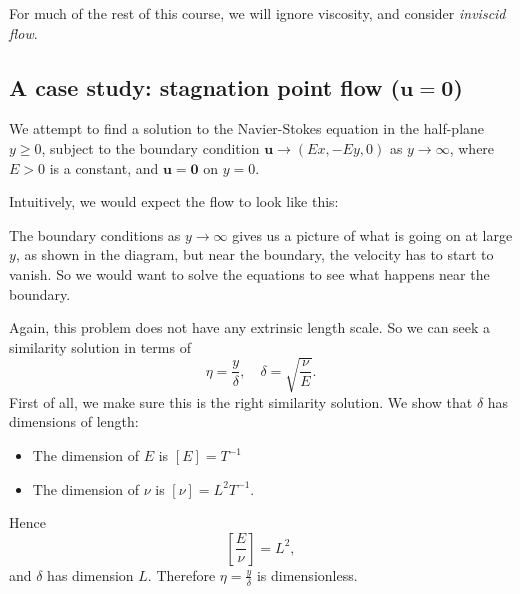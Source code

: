 \documentclass[a4paper]{article}
\begin{document}
For much of the rest of this course, we will ignore viscosity, and consider \emph{inviscid flow}.

\subsection{A case study: stagnation point flow (\texorpdfstring{$\mathbf{u} = \mathbf{0}$}{u = 0})}
\begin{eg}
  We attempt to find a solution to the Navier-Stokes equation in the half-plane $y \geq 0$, subject to the boundary condition $\mathbf{u} \to (Ex, -E y, 0)$ as $y \to \infty$, where $E > 0$ is a constant, and $\mathbf{u} = \mathbf{0}$ on $y = 0$.

  Intuitively, we would expect the flow to look like this:
  \begin{center}
  \end{center}
  The boundary conditions as $y \to \infty$ gives us a picture of what is going on at large $y$, as shown in the diagram, but near the boundary, the velocity has to start to vanish. So we would want to solve the equations to see what happens near the boundary.

  Again, this problem does not have any extrinsic length scale. So we can seek a similarity solution in terms of
  \[
    \eta = \frac{y}{\delta}, \quad \delta = \sqrt{\frac{\nu}{E}}.
  \]
  First of all, we make sure this is the right similarity solution. We show that $\delta$ has dimensions of length:
  \begin{itemize}
    \item The dimension of $E$ is $[E] = T^{-1}$
    \item The dimension of $\nu$ is $[\nu] = L^2 T^{-1}$.
  \end{itemize}
  Hence
  \[
    \left[\frac{E}{\nu}\right] = L^2,
  \]
  and $\delta$ has dimension $L$. Therefore $\eta = \frac{y}{\delta}$ is dimensionless.


\end{eg}
\end{document}
